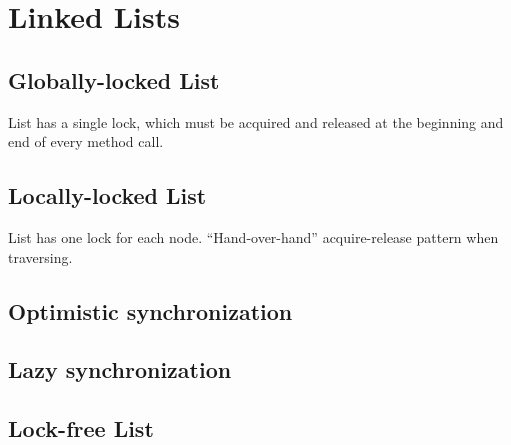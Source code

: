 \chapter{Linked Lists}\label{chp:linked_lists}
\minitoc

\section{Globally-locked List}
List has a single lock, which must be acquired and released at the beginning and end of every method call.

\section{Locally-locked List}
List has one lock for each node. ``Hand-over-hand'' acquire-release pattern when traversing.

\section{Optimistic synchronization}

\section{Lazy synchronization}

\section{Lock-free List}

